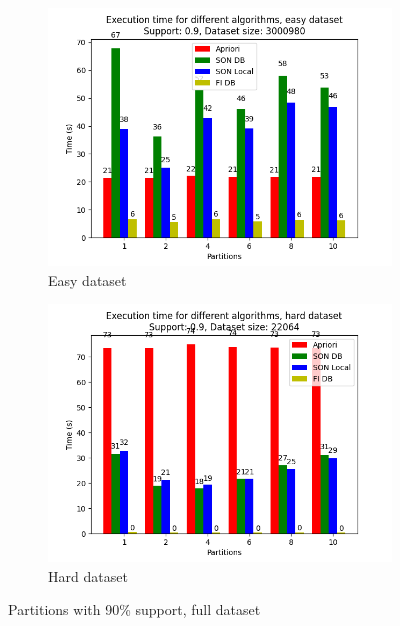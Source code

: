 \documentclass[a4paper]{article}
\begin{document}
	\begin{figure}[h]
		\centering
		\begin{subfigure}[b]{\textwidth}
			\centering
			\includegraphics[width=\textwidth]{1_easy_0,9_1_partitions.png}
         	\caption{Easy dataset}
         	\label{fig:09sup-e}
		\end{subfigure}
		\hfill		
		\begin{subfigure}[b]{\textwidth}
			\centering
			\includegraphics[width=\textwidth]{1_hard_0,9_1_partitions.png}
         	\caption{Hard dataset}
         	\label{fig:09sup-h}
		\end{subfigure}
		\hfill
		
		\caption{Partitions with 90\% support, full dataset}
		\label{fig:09sup}
	\end{figure}
\end{document}
